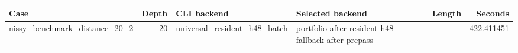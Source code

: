{\small
\begin{tabular}{lrllrr}
\hline
Case & Depth & CLI backend & Selected backend & Length & Seconds \\
\hline
nissy\_benchmark\_distance\_20\_2 & 20 & universal\_resident\_h48\_batch & portfolio-after-resident-h48-fallback-after-prepass & -- & 422.411451 \\
\hline
\end{tabular}
}
